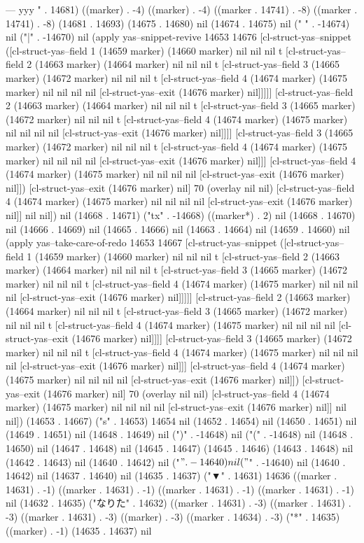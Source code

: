 ---
yyy
" . 14681) ((marker) . -4) ((marker) . -4) ((marker . 14741) . -8) ((marker . 14741) . -8) (14681 . 14693) (14675 . 14680) nil (14674 . 14675) nil (" " . -14674) nil ("|" . -14670) nil (apply yas--snippet-revive 14653 14676 [cl-struct-yas--snippet ([cl-struct-yas--field 1 (14659 marker) (14660 marker) nil nil nil t [cl-struct-yas--field 2 (14663 marker) (14664 marker) nil nil nil t [cl-struct-yas--field 3 (14665 marker) (14672 marker) nil nil nil t [cl-struct-yas--field 4 (14674 marker) (14675 marker) nil nil nil nil [cl-struct-yas--exit (14676 marker) nil]]]]] [cl-struct-yas--field 2 (14663 marker) (14664 marker) nil nil nil t [cl-struct-yas--field 3 (14665 marker) (14672 marker) nil nil nil t [cl-struct-yas--field 4 (14674 marker) (14675 marker) nil nil nil nil [cl-struct-yas--exit (14676 marker) nil]]]] [cl-struct-yas--field 3 (14665 marker) (14672 marker) nil nil nil t [cl-struct-yas--field 4 (14674 marker) (14675 marker) nil nil nil nil [cl-struct-yas--exit (14676 marker) nil]]] [cl-struct-yas--field 4 (14674 marker) (14675 marker) nil nil nil nil [cl-struct-yas--exit (14676 marker) nil]]) [cl-struct-yas--exit (14676 marker) nil] 70 (overlay nil nil) [cl-struct-yas--field 4 (14674 marker) (14675 marker) nil nil nil nil [cl-struct-yas--exit (14676 marker) nil]] nil nil]) nil (14668 . 14671) ("tx" . -14668) ((marker*) . 2) nil (14668 . 14670) nil (14666 . 14669) nil (14665 . 14666) nil (14663 . 14664) nil (14659 . 14660) nil (apply yas--take-care-of-redo 14653 14667 [cl-struct-yas--snippet ([cl-struct-yas--field 1 (14659 marker) (14660 marker) nil nil nil t [cl-struct-yas--field 2 (14663 marker) (14664 marker) nil nil nil t [cl-struct-yas--field 3 (14665 marker) (14672 marker) nil nil nil t [cl-struct-yas--field 4 (14674 marker) (14675 marker) nil nil nil nil [cl-struct-yas--exit (14676 marker) nil]]]]] [cl-struct-yas--field 2 (14663 marker) (14664 marker) nil nil nil t [cl-struct-yas--field 3 (14665 marker) (14672 marker) nil nil nil t [cl-struct-yas--field 4 (14674 marker) (14675 marker) nil nil nil nil [cl-struct-yas--exit (14676 marker) nil]]]] [cl-struct-yas--field 3 (14665 marker) (14672 marker) nil nil nil t [cl-struct-yas--field 4 (14674 marker) (14675 marker) nil nil nil nil [cl-struct-yas--exit (14676 marker) nil]]] [cl-struct-yas--field 4 (14674 marker) (14675 marker) nil nil nil nil [cl-struct-yas--exit (14676 marker) nil]]) [cl-struct-yas--exit (14676 marker) nil] 70 (overlay nil nil) [cl-struct-yas--field 4 (14674 marker) (14675 marker) nil nil nil nil [cl-struct-yas--exit (14676 marker) nil]] nil nil]) (14653 . 14667) ("s" . 14653) 14654 nil (14652 . 14654) nil (14650 . 14651) nil (14649 . 14651) nil (14648 . 14649) nil (")" . -14648) nil ("(" . -14648) nil (14648 . 14650) nil (14647 . 14648) nil (14645 . 14647) (14645 . 14646) (14643 . 14648) nil (14642 . 14643) nil (14640 . 14642) nil ("$" . -14640) nil ("$" . -14640) nil (14640 . 14642) nil (14637 . 14640) nil (14635 . 14637) ("▼" . 14631) 14636 ((marker . 14631) . -1) ((marker . 14631) . -1) ((marker . 14631) . -1) ((marker . 14631) . -1) nil (14632 . 14635) ("なりた" . 14632) ((marker . 14631) . -3) ((marker . 14631) . -3) ((marker . 14631) . -3) ((marker) . -3) ((marker . 14634) . -3) ("*" . 14635) ((marker) . -1) (14635 . 14637) nil 